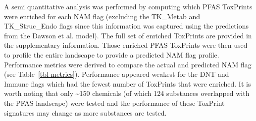 \documentclass[
  super,
  preprint,
  3p]{elsarticle}
\begin{document}
A semi quantitative analysis was performed by computing which PFAS
ToxPrints were enriched for each NAM flag (excluding the TK\_Metab and
TK\_Struc\_Endo flags since this information was captured using the
predictions from the Dawson et al. \citep{dawson_2023} model). The full
set of enriched ToxPrints are provided in the supplementary information.
Those enriched PFAS ToxPrints were then used to profile the entire
landscape to provide a predicted NAM flag profile. Performance metrics
were derived to compare the actual and predicted NAM flag (see
Table~\ref{tbl-metrics}). Performance appeared weakest for the DNT and
Immune flags which had the fewest number of ToxPrints that were
enriched. It is worth noting that only \textasciitilde150 chemicals (of
which 124 substances overlapped with the PFAS landscape) were tested and
the performance of these ToxPrint signatures may change as more
substances are tested.
\end{document}
